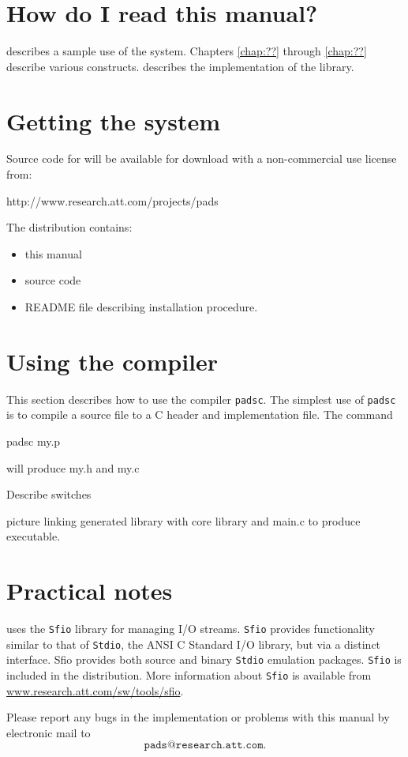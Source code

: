 \section{How do I read this manual?}
 describes a sample use of the \PADS{} system.
Chapters \ref{chap:??} through \ref{chap:??} describe various
constructs. 
 describes the implementation of the
library. 


\section{Getting the \PADS{} system}
Source code for \PADS{} will be available for download with
a non-commercial use license from: 
\begin{centercode}
http://www.research.att.com/projects/pads
\end{centercode}

The \PADS{} distribution contains:
\begin{itemize}
\item this manual
\item source code 
\item README file describing installation procedure.
\end{itemize}

\section{Using the \PADS{} compiler}
This section describes how to use the \PADS{} compiler \texttt{padsc}.
The simplest use of \texttt{padsc} is to compile a \PADSL{} source file
to a C header and implementation file.  The command
\begin{centercode}
padsc my.p
\end{centercode} %
will produce my.h and my.c

Describe switches

picture linking generated library with core library and main.c to
produce executable.

\section{Practical notes}
\pads{} uses the \texttt{Sfio} library for managing I/O
streams. \texttt{Sfio} provides functionality similar to that of
\texttt{Stdio}, the ANSI C Standard I/O library, but via a distinct
interface.  Sfio provides both source and binary \texttt{Stdio}
emulation packages. \texttt{Sfio} is included in the \pads{}
distribution.  More information about \texttt{Sfio} is available from
\url{www.research.att.com/sw/tools/sfio}.


Please report any bugs in the \PADS{} implementation or problems with
this manual by electronic mail to 
\[
\texttt{pads@research.att.com}.
\]